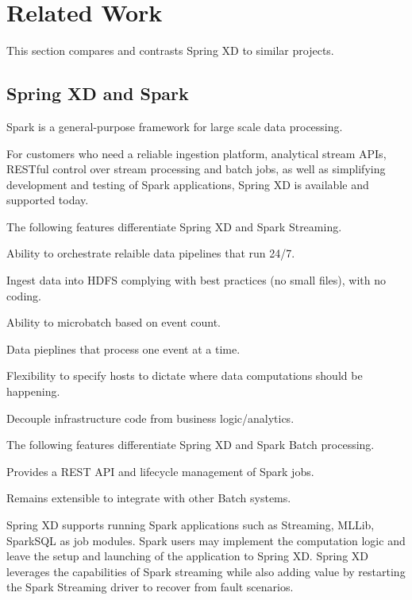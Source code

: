 \section{Related Work}
This section compares and contrasts Spring XD to similar projects.

\subsection{Spring XD and Spark}
Spark is a general-purpose framework for large scale data processing.

For customers who need a reliable ingestion platform, analytical stream APIs, RESTful control over stream processing and batch jobs, as well as simplifying development and testing of Spark applications, Spring XD is available and supported today.

The following features differentiate Spring XD and Spark Streaming.

\begin{itemize*}
\item Ability to orchestrate relaible data pipelines that run 24/7.
\item Ingest data into HDFS complying with best practices (no small files), with no coding.
\item Ability to microbatch based on event count.
\item Data pieplines that process one event at a time.
\item Flexibility to specify hosts to dictate where data computations should be happening.
\item Decouple infrastructure code from business logic\slash analytics.
\end{itemize*}

The following features differentiate Spring XD and Spark Batch processing.

\begin{itemize*}
\item Provides a REST API and lifecycle management of Spark jobs.
\item Remains extensible to integrate with other Batch systems.
\end{itemize*}

Spring XD supports running Spark applications such as Streaming, MLLib, SparkSQL as job modules.
Spark users may implement the computation logic and leave the setup and launching of the
application to Spring XD. Spring XD leverages the capabilities of Spark streaming while
also adding value by restarting the Spark Streaming driver to recover from fault scenarios.

